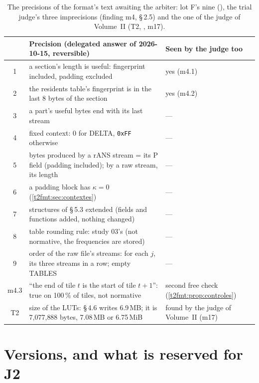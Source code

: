 \begin{table}[ht]
\centering\small
\begin{tabularx}{\linewidth}{c >{\raggedright\arraybackslash}X >{\raggedright\arraybackslash}X}
\toprule
& Precision (delegated answer of 2026-10-15, reversible) & Seen by the judge too \\
\midrule
1 & a section's length is useful: fingerprint included, padding excluded & yes (m4.1) \\
2 & the residents table's fingerprint is in the last 8 bytes of the section & yes (m4.2) \\
3 & a part's useful bytes end with its last stream & — \\
4 & fixed context: 0 for DELTA, \texttt{0xFF} otherwise & — \\
5 & bytes produced by a rANS stream = its P field (padding included); by a raw stream, its length & — \\
6 & a padding block has $\kappa = 0$ (\cref{t2fmt:sec:contextes}) & — \\
7 & structures of §\,5.3 extended (fields and functions added, nothing changed) & — \\
8 & table rounding rule: study 03's (not normative, the frequencies are stored) & — \\
9 & order of the raw file's streams: for each $j$, its three streams in a row; empty TABLES & — \\
m4.3 & ``the end of tile $t$ is the start of tile $t+1$'': true on 100\,\% of tiles, not normative & second free check (\cref{t2fmt:prop:controles}) \\
T2 & size of the LUTs: §\,4.6 writes 6.9\,MB; it is 7{,}077{,}888 bytes, 7.08\,MB or 6.75\,MiB & found by the judge of Volume~II (m17) \\
\bottomrule
\end{tabularx}
\caption[Precisions of the text awaiting the arbiter]{The precisions of the format's text awaiting the arbiter: lot F's nine (), the trial judge's three imprecisions (finding m4,  §\,2.5) and the one of the judge of Volume~II (T2, , m17).}
\label{t2fmt:tab:precisions}
\end{table}

\section{Versions, and what is reserved for J2}\label{t2fmt:sec:versions}


